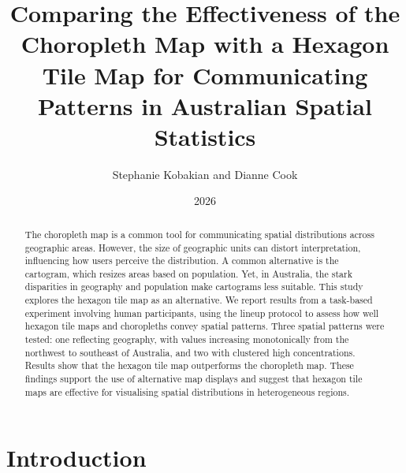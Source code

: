 \documentclass[
doublespace,
  times]{anzsauth}
\title{Comparing the Effectiveness of the Choropleth Map with a Hexagon
Tile Map for Communicating Patterns in Australian Spatial Statistics}
\author{
Stephanie Kobakian\addressnum{1} and
Dianne Cook\addressnum{2}
}
\affiliation{
Queensland University of Technology and
Monash University
}
\date{2026}
\begin{document}
\begin{abstract}
The choropleth map is a common tool for communicating spatial
distributions across geographic areas. However, the size of geographic
units can distort interpretation, influencing how users perceive the
distribution. A common alternative is the cartogram, which resizes areas
based on population. Yet, in Australia, the stark disparities in
geography and population make cartograms less suitable. This study
explores the hexagon tile map as an alternative. We report results from
a task-based experiment involving human participants, using the lineup
protocol to assess how well hexagon tile maps and choropleths convey
spatial patterns. Three spatial patterns were tested: one reflecting
geography, with values increasing monotonically from the northwest to
southeast of Australia, and two with clustered high concentrations.
Results show that the hexagon tile map outperforms the choropleth map.
These findings support the use of alternative map displays and suggest
that hexagon tile maps are effective for visualising spatial
distributions in heterogeneous regions.
\end{abstract}

          

\maketitle


\section{Introduction}\label{sec-introduction}
\end{document}
